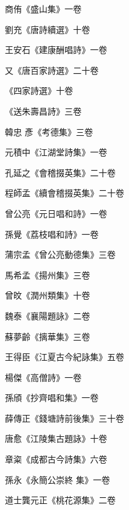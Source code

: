 \begin{pinyinscope}
 商侑《盛山集》一卷



 劉充《唐詩續選》十卷



 王安石《建康酬唱詩》一卷



 又《唐百家詩選》二十卷



 《四家詩選》十卷



 《送朱壽昌詩》三卷



 韓忠
 彥《考德集》三卷



 元積中《江湖堂詩集》一卷



 孔延之《會稽掇英集》二十卷



 程師孟《續會稽掇英集》二十卷



 曾公亮《元日唱和詩》一卷



 孫覺《荔枝唱和詩》一卷



 蒲宗孟《曾公亮動德集》三卷



 馬希孟《揚州集》三卷



 曾旼《潤州類集》十卷



 魏泰《襄陽題詠》二卷



 蘇夢齡《摛華集》三卷



 王得臣《江夏古今紀詠集》五卷



 楊傑《高僧詩》一卷



 孫頎《抄齊唱和集》一卷



 薛傳正《錢塘詩前後集》三十卷



 唐愈《江陵集古題詠》十卷



 章粢《成都古今詩集》六卷



 孫永《永簡公崇終
 集》一卷



 道士龔元正《桃花源集》二卷




\end{pinyinscope}
